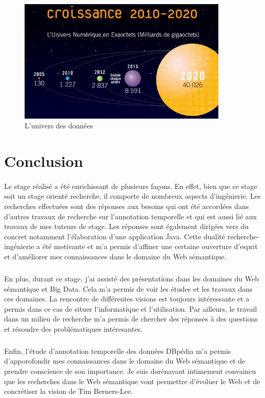 \begin{figure}[H]
        \centering
                \centering
                \includegraphics[width=10cm]{datas.jpg}
               \caption{L'univers des données}

\end{figure}
\newpage
\section*{Conclusion}
\paragraph{}
Le stage réalisé a été enrichissant de plusieurs façons. En effet, bien que ce stage soit un stage orienté recherche, il comporte de nombreux aspects d'ingénierie. Les recherches effectuées sont des réponses aux besoins qui ont été accordées dans d'autres travaux de recherche sur l'annotation temporelle et qui est aussi lié aux travaux de mes tuteurs de stage. Les réponses sont également dirigées vers du concret notamment l'élaboration d'une application Java. Cette dualité recherche-ingénierie a été motivante et m'a permis d'affiner une certaine ouverture d'esprit et d'améliorer mes connaissances dans le domaine du Web sémantique.
\subparagraph{}
En plus, durant ce stage, j'ai assisté des présentations dans les domaines du Web sémantique et Big Data. Cela m'a permis de voir les études et les travaux dans ces domaines. La rencontre de différentes visions est toujours intéressante et a permis dans ce cas de situer l'informatique et l'utilisation. Par ailleurs, le travail dans un milieu de recherche m'a permis de chercher des réponses à des questions et résoudre des problématiques intéresantes.
\subparagraph{}
Enfin, l'étude d'annotation temporelle des données DBpédia m'a permis d'apporofondir mes connaissances dans le domaine du Web sémantique et de prendre conscience de son importance. Je suis dorénavant intimement convaincu que les recherches dans le Web sémantique vont permettre d'évoluer le Web et de concrétiser la vision de Tim Berners-Lee.   
